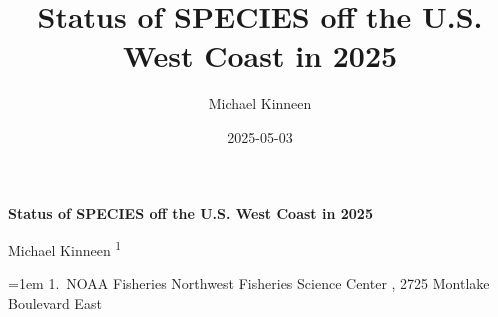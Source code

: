 \documentclass[
]{scrartcl}
\title{Status of SPECIES off the U.S. West Coast in 2025}
\author{Michael Kinneen}
\date{2025-05-03}
\begin{document}
  \begin{titlepage}

  \begin{minipage}[b][\textheight][s]{\textwidth}


  \raggedright




  {\huge\bfseries\nohyphens{Status of SPECIES off the U.S. West Coast in
  2025}}\\[1\baselineskip]



  \vspace{1\baselineskip}


  \vspace{1\baselineskip}

  {\large{Michael Kinneen}}%
  {\textsuperscript{1}}%



  \vspace{2\baselineskip}

  \hangindent=1em
  {1}.~{NOAA Fisheries Northwest Fisheries Science Center}%
  , %
  {2725 Montlake Boulevard East}%


  \vspace{1\baselineskip}



\end{minipage}
\end{titlepage}
\end{document}
